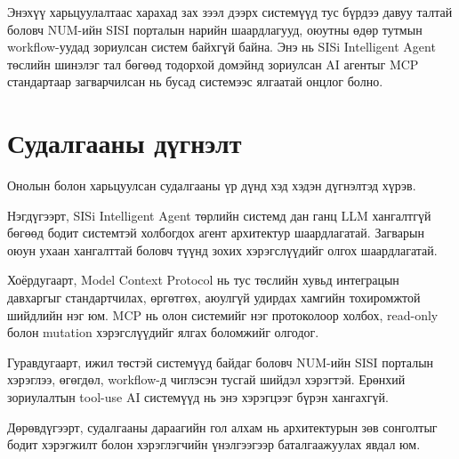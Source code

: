 Энэхүү харьцуулалтаас харахад зах зээл дээрх системүүд тус бүрдээ давуу талтай боловч NUM-ийн SISI порталын нарийн шаардлагууд, оюутны өдөр тутмын workflow-уудад зориулсан систем байхгүй байна. Энэ нь SISi Intelligent Agent төслийн шинэлэг тал бөгөөд тодорхой домэйнд зориулсан AI агентыг MCP стандартаар загварчилсан нь бусад системээс ялгаатай онцлог болно.

\section{Судалгааны дүгнэлт}

Онолын болон харьцуулсан судалгааны үр дүнд хэд хэдэн дүгнэлтэд хүрэв.

Нэгдүгээрт, SISi Intelligent Agent төрлийн системд дан ганц LLM хангалтгүй бөгөөд бодит системтэй холбогдох агент архитектур шаардлагатай. Загварын оюун ухаан хангалттай боловч түүнд зохих хэрэгслүүдийг олгох шаардлагатай.

Хоёрдугаарт, Model Context Protocol нь тус төслийн хувьд интеграцын давхаргыг стандартчилах, өргөтгөх, аюулгүй удирдах хамгийн тохиромжтой шийдлийн нэг юм. MCP нь олон системийг нэг протоколоор холбох, read-only болон mutation хэрэгслүүдийг ялгах боломжийг олгодог.

Гуравдугаарт, ижил төстэй системүүд байдаг боловч NUM-ийн SISI порталын хэрэглээ, өгөгдөл, workflow-д чиглэсэн тусгай шийдэл хэрэгтэй. Ерөнхий зориулалтын tool-use AI системүүд нь энэ хэрэгцээг бүрэн хангахгүй.

Дөрөвдүгээрт, судалгааны дараагийн гол алхам нь архитектурын зөв сонголтыг бодит хэрэгжилт болон хэрэглэгчийн үнэлгээгээр баталгаажуулах явдал юм.

